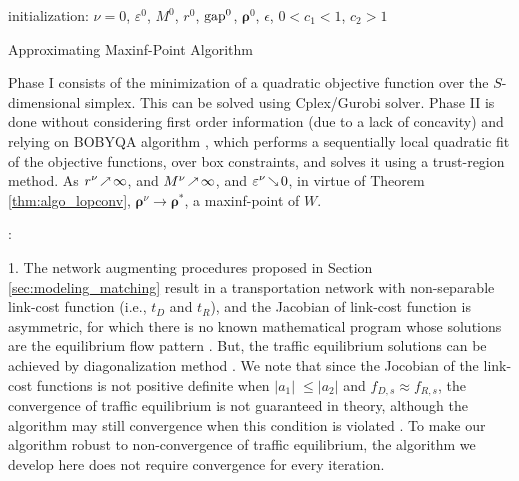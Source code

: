 \documentclass[review]{elsarticle}
\begin{document}
\begin{algorithm}[H]
	\KwResult{$\boldsymbol{\rho}^{\nu}$}
	initialization: $\nu = 0$, $\varepsilon^0$, $M^0$, $r^0$, ${\rm gap}^0$, $\boldsymbol{\rho}^0$, $\epsilon$, $0<c_1<1$, $c_2>1$\;
	
	\caption{Approximating Maxinf-Point Algorithm}
	\label{alg:iter}
\end{algorithm}

Phase I consists of the minimization of a quadratic objective function over the $S$-dimensional simplex. This can be solved using Cplex/Gurobi solver. Phase II is done without considering first order information (due to a lack of concavity) and relying on BOBYQA algorithm \citep{Pow09:bobyqa}, which performs a sequentially local quadratic fit of the objective functions, over box constraints, and solves it using a trust-region method. As $r^\nu\upto \infty$, and $M^\nu\upto\infty$, and $\varepsilon^\nu\downto 0$, in virtue of Theorem \ref{thm:algo_lopconv}, $\bm{\rho}^\nu\to\bm{\rho}^*$, a maxinf-point of $W$.

: 

1. The network augmenting procedures proposed in Section \ref{sec:modeling_matching} result in a transportation network with non-separable link-cost function (i.e., $t_{D}$ and $t_R$), and the Jacobian of link-cost function is asymmetric, for which there is no known mathematical program whose solutions are the equilibrium flow pattern \citep{Sheffi_85}. But, the traffic equilibrium solutions can be achieved by diagonalization method \citep{Sheffi_85}.  We note that since the Jocobian of the link-cost functions is not positive definite when $|a_1|\; \leq|a_2|$ and $f_{D,s} \approx f_{R,s}$, the convergence of traffic equilibrium is not guaranteed in theory, although the algorithm may still convergence when this condition is violated \citep{fisk1982solution}. To make our algorithm robust to non-convergence of traffic equilibrium, the algorithm we develop here does not require convergence for every iteration.
\end{document}
